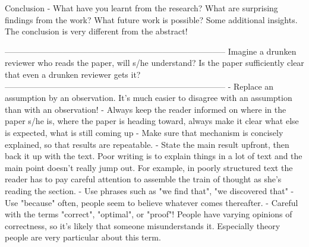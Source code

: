Conclusion
- What have you learnt from the research? What are surprising findings
  from the work? What future work is possible? Some additional
  insights. The conclusion is very different from the abstract!


--------------------------------------------------------------------------------
Imagine a drunken reviewer who reads the paper, will s/he understand?
Is the paper sufficiently clear that even a drunken reviewer gets it?
--------------------------------------------------------------------------------
- Replace an assumption by an observation. It's much easier to disagree
  with an assumption than with an observation!
- Always keep the reader informed on where in the paper s/he is, where
  the paper is heading toward, always make it clear what else is
  expected, what is still coming up
- Make sure that mechanism is concisely explained, so that results are
  repeatable.
- State the main result upfront, then back it up with the text. Poor
  writing is to explain things in a lot of text and the main point
  doesn't really jump out. For example, in poorly structured text the
  reader has to pay careful attention to assemble the train of thought
  as she's reading the section.
- Use phrases such as "we find that", "we discovered that"
- Use "because" often, people seem to believe whatever comes thereafter.
- Careful with the terms "correct", "optimal", or "proof"! People have
  varying opinions of correctness, so it's likely that someone
  misunderstands it. Especially theory people are very particular
  about this term.
